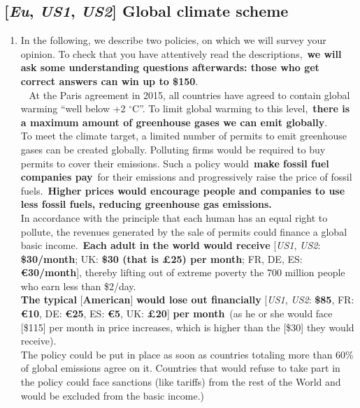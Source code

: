 \documentclass[12pt,english]{article}
\begin{document}
\subsection*{[\textit{Eu}, \textit{US1}, \textit{US2}] Global climate scheme}\label{subsec:questionnaire_GCS}
\begin{enumerate}[resume] \item[] In the following, we describe two policies, on which we will survey your opinion. To check that you have attentively read the descriptions,~\textbf{we will ask some understanding questions afterwards: those who get correct answers can win up to \$150}. \\
\textbf{}~ At the Paris agreement in 2015, all countries have agreed to contain global warming ``well below +2 $\mathrm{{}^\circ}$C''. To limit global warming to this level,~\textbf{there is a maximum amount of greenhouse gases we can emit globally}.\\
To meet the climate target, a limited number of permits to emit greenhouse gases can be created globally. Polluting firms would be required to buy permits to cover their emissions. Such a policy would~\textbf{make fossil fuel companies pay}~for their emissions and progressively raise the price of fossil fuels.~\textbf{Higher prices would encourage people and companies to use less fossil fuels, reducing greenhouse gas emissions.}\\
In accordance with the principle that each human has an equal right to pollute, the revenues generated by the sale of permits could finance a global basic income.~\textbf{Each adult in the world would receive } [\textit{US1}, \textit{US2}: \textbf{\$30/month}; UK: \textbf{\$30 (that is £25) per month}; FR, DE, ES:  \textbf{\euro{}30/month}], thereby lifting out of extreme poverty the 700 million people who earn less than \$2/day.\\
\textbf{The typical }[\textbf{American}]\textbf{ would lose out financially }[\textit{US1}, \textit{US2}: \textbf{\$85}, FR: \textbf{\euro{}10}, DE: \textbf{\euro{}25}, ES: \textbf{\euro{}5}, UK: \textbf{£20}]\textbf{ per month}~(as he or she would face [\$115] per month in price increases, which is higher than the [\$30] they would receive). 
\\The policy could be put in place as soon as countries totaling more than 60\% of global emissions agree on it. Countries that would refuse to take part in the policy could face sanctions (like tariffs) from the rest of the World and would be excluded from the basic income.)

\end{enumerate}
\end{document}
